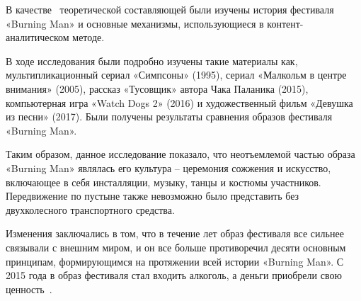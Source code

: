 \documentclass[10pt,a4paper]{report}
\begin{document}
\begin{multicols}{2}
В качестве~\cite{тихомирова2016фестиваль} теоретической составляющей были
изучены история фестиваля «Burning Man» и основные механизмы,
использующиеся в контент-аналитическом методе.


В ходе исследования были подробно изучены такие материалы как,
мультипликационный сериал «Симпсоны» (1995), сериал «Малкольм в
центре внимания» (2005), рассказ «Тусовщик» автора Чака Паланика
(2015), компьютерная игра «Watch Dogs 2» (2016) и художественный
фильм «Девушка из песни» (2017). Были получены результаты
сравнения образов фестиваля «Burning Man».

Таким образом, данное исследование показало, что неотъемлемой
частью образа «Burning Man» являлась его культура – церемония
сожжения и искусство, включающее в себя инсталляции, музыку,
танцы и костюмы участников. Передвижение по пустыне также
невозможно было представить без двухколесного транспортного
средства.

Изменения заключались в том, что в течение лет образ фестиваля
все сильнее связывали с внешним миром, и он все больше
противоречил десяти основным принципам, формирующимся на
протяжении всей истории «Burning Man». С 2015 года в образ
фестиваля стал входить алкоголь, а деньги приобрели свою 
ценность~\cite{фасмер1964этимологический}.
\end{multicols}

\printbibliography
{}
\end{document}
